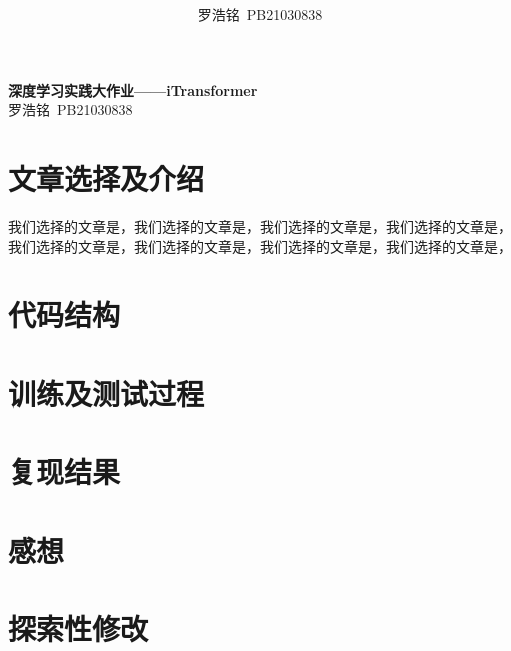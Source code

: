 \documentclass[twoside,12pt]{article}
\title{ }
\author{罗浩铭\ PB21030838}
\begin{document}
\fancyhf{} %
\fancyfoot[C]{\thepage} %
\fancyhead[l]{\footnotesize  }

\renewcommand{\headrulewidth}{0pt} %

\begin{center}
    \textbf{\LARGE{深度学习实践大作业——iTransformer}}\\
    \vspace{0.2cm}
    \large{罗浩铭\ PB21030838}
\end{center}

\section{文章选择及介绍}
我们选择的文章是，我们选择的文章是，我们选择的文章是，我们选择的文章是，我们选择的文章是，我们选择的文章是，我们选择的文章是，我们选择的文章是，

\section{代码结构}


\section{训练及测试过程}


\section{复现结果}


\section{感想}


\section{探索性修改}
\end{document}
